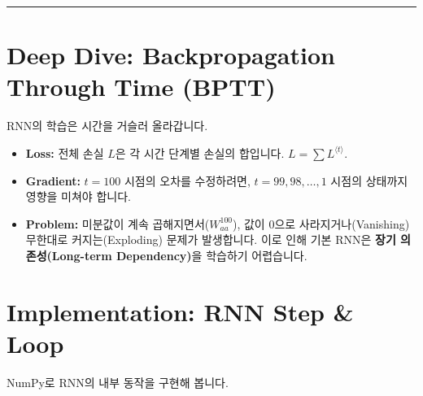 \documentclass[11pt,a4paper]{book}
\theoremstyle{definition}
\begin{document}
\vspace{0.5cm}\hrule\vspace{0.5cm}

\section{Deep Dive: Backpropagation Through Time (BPTT)}

RNN의 학습은 시간을 거슬러 올라갑니다.

\begin{itemize}
    \item \textbf{Loss:} 전체 손실 $L$은 각 시간 단계별 손실의 합입니다. $L = \sum L^{\langle t \rangle}$.
    \item \textbf{Gradient:} $t=100$ 시점의 오차를 수정하려면, $t=99, 98, \dots, 1$ 시점의 상태까지 영향을 미쳐야 합니다.
    \item \textbf{Problem:} 미분값이 계속 곱해지면서($W_{aa}^{100}$), 값이 0으로 사라지거나(Vanishing) 무한대로 커지는(Exploding) 문제가 발생합니다. 이로 인해 기본 RNN은 \textbf{장기 의존성(Long-term Dependency)}을 학습하기 어렵습니다.
\end{itemize}

\section{Implementation: RNN Step \& Loop}

NumPy로 RNN의 내부 동작을 구현해 봅니다.
\end{document}
